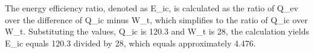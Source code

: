 The energy efficiency ratio, denoted as E_ic, is calculated as the ratio of Q_ev over the difference of Q_ic minus W_t, which simplifies to the ratio of Q_ic over W_t. Substituting the values, Q_ic is 120.3 and W_t is 28, the calculation yields E_ic equals 120.3 divided by 28, which equals approximately 4.476.